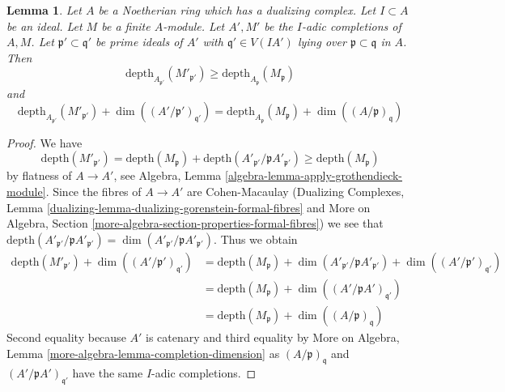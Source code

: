 \documentclass[10pt,a4paper]{amsart}
\theoremstyle{plain}
\newtheorem{lemma}[subsection]{Lemma}
\theoremstyle{definition}
\theoremstyle{remark}
\numberwithin{equation}{subsection}
\begin{document}
\begin{lemma}
\label{lemma-change-completion}
Let $A$ be a Noetherian ring which has a dualizing complex.
Let $I \subset A$ be an ideal.
Let $M$ be a finite $A$-module. Let $A', M'$ be the $I$-adic
completions of $A, M$. Let $\mathfrak p' \subset \mathfrak q'$
be prime ideals of $A'$ with $\mathfrak q' \in V(IA')$
lying over $\mathfrak p \subset \mathfrak q$ in $A$. Then
$$
\text{depth}_{A_{\mathfrak p'}}(M'_{\mathfrak p'})
\geq
\text{depth}_{A_\mathfrak p}(M_\mathfrak p)
$$
and
$$
\text{depth}_{A_{\mathfrak p'}}(M'_{\mathfrak p'}) +
\dim((A'/\mathfrak p')_{\mathfrak q'}) =
\text{depth}_{A_\mathfrak p}(M_\mathfrak p) +
\dim((A/\mathfrak p)_\mathfrak q)
$$
\end{lemma}

\begin{proof}
We have
$$
\text{depth}(M'_{\mathfrak p'}) =
\text{depth}(M_\mathfrak p) +
\text{depth}(A'_{\mathfrak p'}/\mathfrak p A'_{\mathfrak p'})
\geq \text{depth}(M_\mathfrak p)
$$
by flatness of $A \to A'$, see
Algebra, Lemma \ref{algebra-lemma-apply-grothendieck-module}.
Since the fibres of $A \to A'$ are Cohen-Macaulay
(Dualizing Complexes, Lemma
\ref{dualizing-lemma-dualizing-gorenstein-formal-fibres} and
More on Algebra, Section
\ref{more-algebra-section-properties-formal-fibres})
we see that
$\text{depth}(A'_{\mathfrak p'}/\mathfrak p A'_{\mathfrak p'}) =
\dim(A'_{\mathfrak p'}/\mathfrak p A'_{\mathfrak p'})$.
Thus we obtain
\begin{align*}
\text{depth}(M'_{\mathfrak p'}) +
\dim((A'/\mathfrak p')_{\mathfrak q'})
& =
\text{depth}(M_\mathfrak p) +
\dim(A'_{\mathfrak p'}/\mathfrak p A'_{\mathfrak p'}) +
\dim((A'/\mathfrak p')_{\mathfrak q'}) \\
& =
\text{depth}(M_\mathfrak p) +
\dim((A'/\mathfrak p A')_{\mathfrak q'}) \\
& =
\text{depth}(M_\mathfrak p) +
\dim((A/\mathfrak p)_\mathfrak q)
\end{align*}
Second equality because $A'$ is catenary and third equality by
More on Algebra, Lemma \ref{more-algebra-lemma-completion-dimension}
as $(A/\mathfrak p)_\mathfrak q$ and $(A'/\mathfrak p A')_{\mathfrak q'}$
have the same $I$-adic completions.
\end{proof}
\end{document}
